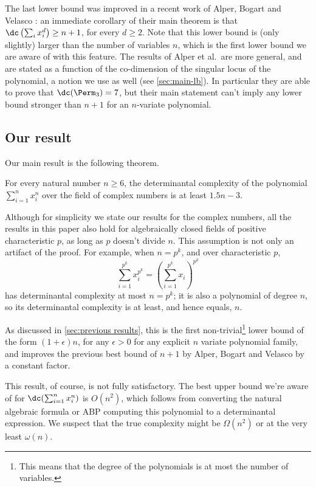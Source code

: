 The last lower bound was improved in a recent work of Alper, Bogart and Velasco \cite{ABV17}: an immediate corollary of their main theorem is that $\dc \left( \sum_i x_i^d \right) \ge n+1$, for every $d \ge 2$. Note that this lower bound is (only slightly) larger than the number of variables $n$, which is the first lower bound we are aware of with this feature. The results of Alper et al.\ are more general, and are stated as a function of the co-dimension of the singular locus of the polynomial, a notion we use as well (see \autoref{sec:main-lb}). In particular they are able to prove that $\dc(\Perm_3)=7$, but their main statement can't imply any lower bound stronger than $n+1$ for an $n$-variate polynomial.

\subsection{Our result}\label{sec:our result}
Our main result is the following theorem. 
\begin{theorem}\label{thm:main}
For every natural number $n \ge 6$, the determinantal complexity of the polynomial  $\sum_{i = 1}^n x_i^n$ over the field of complex numbers  is at least $1.5n - 3$. 
\end{theorem}

Although for simplicity we state our results for the complex numbers, all the results in this paper also hold for algebraically closed fields of positive characteristic $p$, as long as $p$ doesn't divide $n$. This assumption is not only an artifact of the proof. For example, when $n=p^k$, and over characteristic $p$,
\[
\sum_{i=1}^{p^k} x_i^{p^k} = \left( \sum_{i=1}^{p^k} x_i \right)^{p^k}
\]
has determinantal complexity at most $n=p^k$; it is also a polynomial of degree $n$, so its determinantal complexity is at least, and hence equals, $n$.

As discussed in \autoref{sec:previous results}, this is the first non-trivial\footnote{This means that the degree of the polynomials is at most the number of variables.} lower bound of the form $(1 + \epsilon) n$, for any $\epsilon > 0$ for any explicit $n$ variate polynomial family, and improves the previous best bound of $n + 1$ by Alper, Bogart and Velasco \cite{ABV17} by a constant factor.

This result, of course, is not fully satisfactory. The best upper bound we're aware of for $\dc(\sum_{i=1}^n x_i^n)$ is $O(n^2)$, which follows from converting the natural algebraic formula or ABP computing this polynomial to a determinantal expression. We suspect that the true complexity might be $\Omega(n^2)$ or at the very least $\omega(n)$.

